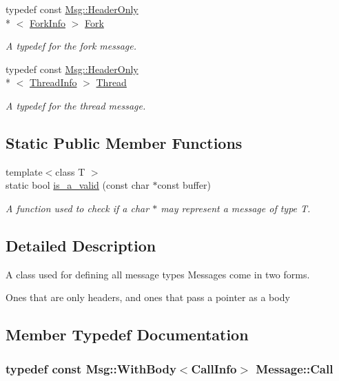 \begin{DoxyCompactItemize}
typedef const \hyperlink{class_message_1_1_msg_a56cc5b2c5d898b85e97b1f3a46ab3999}{Msg\-::\-Header\-Only}\\*
$<$ \hyperlink{struct_message_1_1_fork_info}{Fork\-Info} $>$ \hyperlink{class_message_ab60a0847afbe9dcef7cf5cd87d52ca4a}{Fork}
\begin{DoxyCompactList}\small\item\em A typedef for the fork message. \end{DoxyCompactList}\item 
typedef const \hyperlink{class_message_1_1_msg_a56cc5b2c5d898b85e97b1f3a46ab3999}{Msg\-::\-Header\-Only}\\*
$<$ \hyperlink{struct_message_1_1_thread_info}{Thread\-Info} $>$ \hyperlink{class_message_ae1a764549f29ec802d15e731ea78e397}{Thread}
\begin{DoxyCompactList}\small\item\em A typedef for the thread message. \end{DoxyCompactList}\end{DoxyCompactItemize}
\subsection*{Static Public Member Functions}
\begin{DoxyCompactItemize}
\item 
{\footnotesize template$<$class T $>$ }\\static bool \hyperlink{class_message_ada73859c8d199a7925b0ba3999cc3eef}{is\-\_\-a\-\_\-valid} (const char $\ast$const buffer)
\begin{DoxyCompactList}\small\item\em A function used to check if a char $\ast$ may represent a message of type T. \end{DoxyCompactList}\end{DoxyCompactItemize}


\subsection{Detailed Description}
A class used for defining all message types Messages come in two forms. 

Ones that are only headers, and ones that pass a pointer as a body 

\subsection{Member Typedef Documentation}
\hypertarget{class_message_a2f9064959df252bdfddff485438cfa4e}{
\subsubsection[{Call}]{\setlength{\rightskip}{0pt plus 5cm}typedef const {\bf Msg\-::\-With\-Body}$<${\bf Call\-Info}$>$ {\bf Message\-::\-Call}}}\label{class_message_a2f9064959df252bdfddff485438cfa4e}


